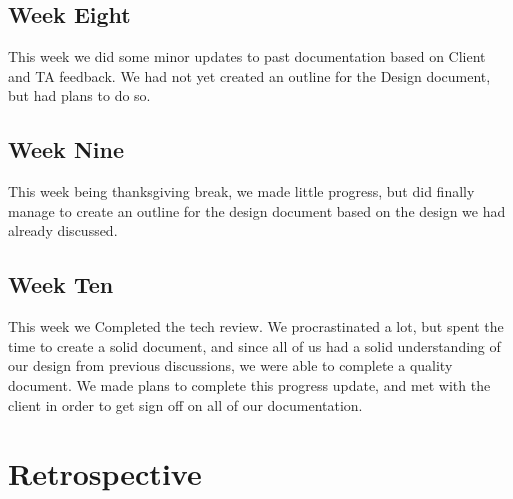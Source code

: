 \documentclass[onecolumn, draftclsnofoot,10pt, compsoc]{IEEEtran}
\begin{document}
\subsection{Week Eight}
This week we did some minor updates to past documentation based on Client and TA feedback. We had not yet created an outline for the Design document, but had plans to do so.
\subsection{Week Nine}
This week being thanksgiving break, we made little progress, but did finally manage to create an outline for the design document based on the design we had already discussed. 
\subsection{Week Ten}
This week we Completed the tech review. We procrastinated a lot, but spent the time to create a solid document, and since all of us had a solid understanding of our design from previous discussions, we were able to complete a quality document. We made plans to complete this progress update, and met with the client in order to get sign off on all of our documentation. 

\section{Retrospective}
\end{document}
